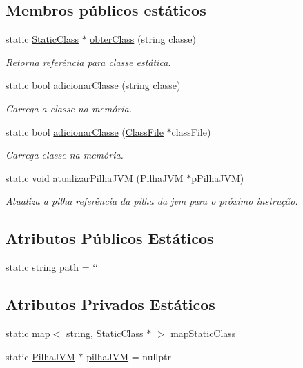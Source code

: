 \subsection*{Membros públicos estáticos}
\begin{DoxyCompactItemize}
\item 
static \hyperlink{classStaticClass}{Static\+Class} $\ast$ \hyperlink{classMethodArea_a6e9d922892887daadd4624729268094f}{obter\+Class} (string classe)
\begin{DoxyCompactList}\small\item\em Retorna referência para classe estática. \end{DoxyCompactList}\item 
static bool \hyperlink{classMethodArea_a30233142aefa26c17a3a222582cb56c1}{adicionar\+Classe} (string classe)
\begin{DoxyCompactList}\small\item\em Carrega a classe na memória. \end{DoxyCompactList}\item 
static bool \hyperlink{classMethodArea_ac2a5ab0e6b36c9af7062f145218b4cf0}{adicionar\+Classe} (\hyperlink{classClassFile}{Class\+File} $\ast$class\+File)
\begin{DoxyCompactList}\small\item\em Carrega classe na memória. \end{DoxyCompactList}\item 
static void \hyperlink{classMethodArea_a6ee32cdf91b461ff3c8a278b5d0cd126}{atualizar\+Pilha\+J\+VM} (\hyperlink{classPilhaJVM}{Pilha\+J\+VM} $\ast$p\+Pilha\+J\+VM)
\begin{DoxyCompactList}\small\item\em Atualiza a pilha referência da pilha da jvm para o próximo instrução. \end{DoxyCompactList}\end{DoxyCompactItemize}
\subsection*{Atributos Públicos Estáticos}
\begin{DoxyCompactItemize}
\item 
static string \hyperlink{classMethodArea_a5fba57684c1552a65932306870b1130c}{path} = \char`\"{}\char`\"{}
\end{DoxyCompactItemize}
\subsection*{Atributos Privados Estáticos}
\begin{DoxyCompactItemize}
\item 
static map$<$ string, \hyperlink{classStaticClass}{Static\+Class} $\ast$ $>$ \hyperlink{classMethodArea_aacecebeabf7f239bfb2ccafe7d11cf63}{map\+Static\+Class}
\item 
static \hyperlink{classPilhaJVM}{Pilha\+J\+VM} $\ast$ \hyperlink{classMethodArea_aed878aaa6b44b11cd9446527c447ede9}{pilha\+J\+VM} = nullptr
\end{DoxyCompactItemize}


